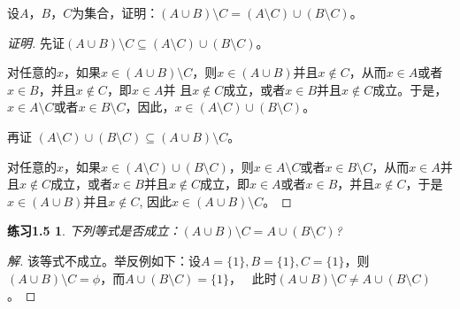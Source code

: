   \begin{Exercise1.4}
   设$A$，$B$，$C$为集合，证明：$(A\cup B) \setminus C = (A\setminus C) \cup
   (B\setminus C)$。
 \end{Exercise1.4}
  \begin{proof}[证明]
   先证$(A\cup B) \setminus C \subseteq (A\setminus C) \cup
   (B\setminus C)$。

   对任意的$x$，如果$x \in (A\cup B) \setminus C$，则$x \in (A\cup B)$并且$x
   \notin C$，从而$x \in A$或者$x \in B$，并且$x \notin C$，即$x \in A$并
   且$x \notin C$成立，或者$x \in B$并且$x \notin C$成立。于是，$x \in A
   \setminus C$或者$x \in B \setminus C$，因此，$x \in (A\setminus C) \cup
   (B\setminus C)$。

   再证 $(A\setminus C) \cup
   (B\setminus C) \subseteq (A\cup B) \setminus C$。

   对任意的$x$，如果$x \in (A\setminus C) \cup
   (B\setminus C)$，则$x \in A
   \setminus C$或者$x \in B \setminus C$，从而$x \in A$并
   且$x \notin C$成立，或者$x \in B$并且$x \notin C$成立，即$x \in A$或者$x \in
   B$，并且$x \notin C$，于是$x \in (A\cup B)$并且$x
   \notin C$, 因此$x \in (A\cup B) \setminus C$。
 \end{proof}

\newtheorem*{Exercise1.5}{练习1.5}

    \begin{Exercise1.5}
      下列等式是否成立：$(A\cup B) \setminus C = A \cup (B\setminus C)$?
    \end{Exercise1.5}

    \begin{proof}[解]
      该等式不成立。举反例如下：设$A = \{1\}, B = \{1\}, C=\{1\}$，则$(A
      \cup B)\setminus C = \phi $，而$A \cup (B\setminus C) = \{1\}$，　
此时$(A\cup B) \setminus C \neq A \cup (B\setminus C)$。
    \end{proof}

\chapter{}
